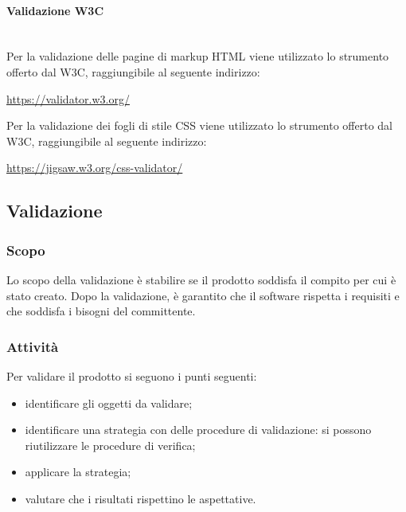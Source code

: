 		\paragraph{Validazione W3C} \mbox{}\\
		Per la validazione delle pagine di markup HTML viene utilizzato lo strumento offerto dal W3C, raggiungibile al seguente indirizzo: \newline
		\centerline{\url{https://validator.w3.org/}} \newline
		Per la validazione dei fogli di stile CSS viene utilizzato lo strumento offerto dal W3C, raggiungibile al seguente indirizzo: \newline
		\centerline{\url{https://jigsaw.w3.org/css-validator/}} \newline

\subsection{Validazione}
	\subsubsection{Scopo}
	Lo scopo della validazione è stabilire se il prodotto soddisfa il compito per cui è stato creato. Dopo la validazione, è garantito che il software rispetta i requisiti e che soddisfa i bisogni del committente.

	\subsubsection{Attività}
	Per validare il prodotto si seguono i punti seguenti:
	\begin{itemize}
		\item identificare gli oggetti da validare;
		\item identificare una strategia con delle procedure di validazione: si possono riutilizzare le procedure di verifica;
		\item applicare la strategia;
		\item valutare che i risultati rispettino le aspettative.
	\end{itemize}
